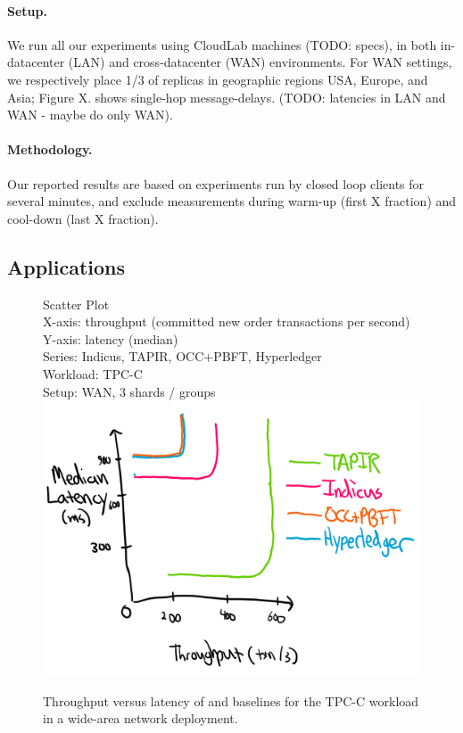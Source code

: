 \paragraph{Setup.} We run all our experiments using CloudLab machines (TODO: specs), in both in-datacenter (LAN) and cross-datacenter (WAN) environments. For WAN settings, we respectively place 1/3 of replicas in geographic regions USA, Europe, and Asia; Figure X. shows single-hop message-delays. (TODO: latencies in LAN and WAN - maybe do only WAN).

\paragraph{Methodology.} Our reported results are based on experiments run by closed loop clients for several minutes, and exclude measurements during warm-up (first X fraction) and cool-down (last X fraction).

\subsection{Applications}

\begin{figure}
  Scatter Plot\\
  X-axis: throughput (committed new order transactions per second)\\
  Y-axis: latency (median)\\
  Series: Indicus, TAPIR, OCC+PBFT, Hyperledger\\
  Workload: TPC-C\\
  Setup: WAN, 3 shards / groups\\
  \includegraphics[width=\columnwidth]{figures/eval/tpcc-tput-lat.png}
  \caption{Throughput versus latency of \sys{} and baselines for the TPC-C
  workload in a wide-area network deployment.}
  \label{fig:tpcc-tput-lat}
\end{figure}

